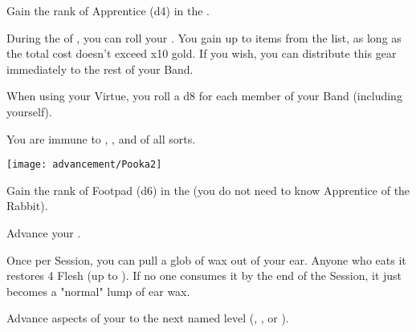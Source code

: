 \begin{multicols*}{2}



Gain the rank of Apprentice (d4) in the .


During the  of , you can roll your \LUCK. You gain up to \SUM items from the  list, as long as the total cost doesn't exceed \SUM x10 gold.  If you wish, you can distribute this gear immediately to the rest of your Band.


When using your  Virtue, you roll a d8 for each member of your Band (including yourself).


You are immune to , , and  of all sorts.

\begin{center}
\texttt{[image: advancement/Pooka2]}
\end{center}

\newpage


Gain the rank of Footpad (d6) in the  (you do not need to know Apprentice of the Rabbit).


Advance your  \DCUP.


Once per Session, you can pull a glob of wax out of your ear.  Anyone who eats it restores 4 Flesh (up to \MAX). If no one consumes it by the end of the Session, it just becomes a "normal" lump of ear wax.


Advance  aspects of your  to the next named level (\DEATH, \INJURY, or \INSANITY).


\end{multicols*}
